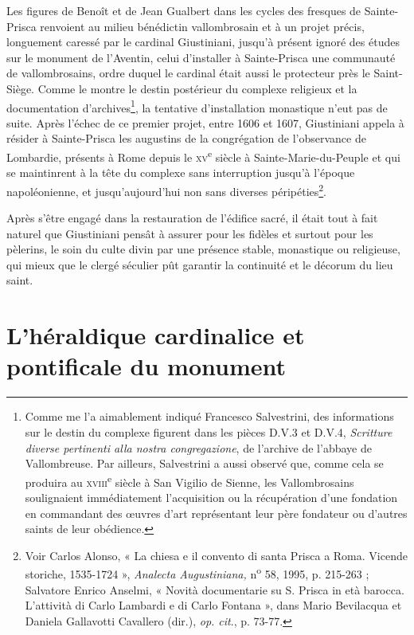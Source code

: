 \documentclass[12pt,twoside,openany]{book}
\begin{document}
Les figures de Benoît et de Jean Gualbert dans les cycles des fresques de Sainte-Prisca renvoient au milieu bénédictin vallombrosain et à un projet précis, longuement caressé par le cardinal Giustiniani, jusqu’à présent ignoré des études sur le monument de l’Aventin, celui d’installer à Sainte-Prisca une communauté de vallombrosains, ordre duquel le cardinal était aussi le protecteur près le Saint-Siège. Comme le montre le destin postérieur du complexe religieux et la documentation d’archives\footnote{Comme me l’a aimablement indiqué Francesco Salvestrini, des informations sur le destin du complexe figurent dans les pièces D.V.3 et D.V.4, \textit{Scritture diverse pertinenti alla nostra congregazione}, de l’archive de l’abbaye de Vallombreuse. Par ailleurs, Salvestrini a aussi observé que, comme cela se produira au \textsc{xviii}\textsuperscript{e} siècle à San Vigilio de Sienne, les Vallombrosains soulignaient immédiatement l’acquisition ou la récupération d’une fondation en commandant des œuvres d’art représentant leur père fondateur ou d’autres saints de leur obédience.}, la tentative d’installation monastique n’eut pas de suite. Après l’échec de ce premier projet, entre 1606 et 1607, Giustiniani appela à résider à Sainte-Prisca les augustins de la congrégation de l’observance de Lombardie, présents à Rome depuis le \textsc{xv}\textsuperscript{e} siècle à Sainte-Marie-du-Peuple et qui se maintinrent à la tête du complexe sans interruption jusqu’à l’époque napoléonienne, et jusqu’aujourd’hui non sans diverses péripéties\footnote{Voir Carlos Alonso, « La chiesa e il convento di santa Prisca a Roma. Vicende storiche, 1535-1724 », \textit{Analecta Augustiniana, }n\textsuperscript{o} 58, 1995, p. 215-263 ; Salvatore Enrico Anselmi, « Novità documentarie su S. Prisca in età barocca. L’attività di Carlo Lambardi e di Carlo Fontana », dans Mario Bevilacqua et Daniela Gallavotti Cavallero (dir.), \textit{op. cit}., p. 73-77.}.

Après s’être engagé dans la restauration de l’édifice sacré, il était tout à fait naturel que Giustiniani pensât à assurer pour les fidèles et surtout pour les pèlerins, le soin du culte divin par une présence stable, monastique ou religieuse, qui mieux que le clergé séculier pût garantir la continuité et le décorum du lieu saint.

\section{L’héraldique cardinalice et pontificale du monument}
\end{document}
